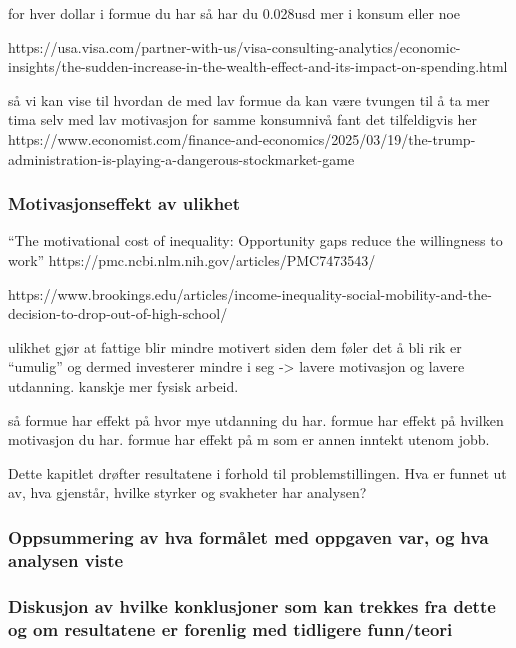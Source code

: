 \documentclass[
  12pt,
  a4paper,
  DIV=11,
  numbers=noendperiod]{scrartcl}
\begin{document}
for hver dollar i formue du har så har du 0.028usd mer i konsum eller
noe

https://usa.visa.com/partner-with-us/visa-consulting-analytics/economic-insights/the-sudden-increase-in-the-wealth-effect-and-its-impact-on-spending.html

så vi kan vise til hvordan de med lav formue da kan være tvungen til å
ta mer tima selv med lav motivasjon for samme konsumnivå fant det
tilfeldigvis her
https://www.economist.com/finance-and-economics/2025/03/19/the-trump-administration-is-playing-a-dangerous-stockmarket-game

\subsubsection{Motivasjonseffekt av
ulikhet}\label{motivasjonseffekt-av-ulikhet}

``The motivational cost of inequality: Opportunity gaps reduce the
willingness to work'' https://pmc.ncbi.nlm.nih.gov/articles/PMC7473543/

https://www.brookings.edu/articles/income-inequality-social-mobility-and-the-decision-to-drop-out-of-high-school/

ulikhet gjør at fattige blir mindre motivert siden dem føler det å bli
rik er ``umulig'' og dermed investerer mindre i seg -\textgreater{}
lavere motivasjon og lavere utdanning. kanskje mer fysisk arbeid.

så formue har effekt på hvor mye utdanning du har. formue har effekt på
hvilken motivasjon du har. formue har effekt på m som er annen inntekt
utenom jobb.

Dette kapitlet drøfter resultatene i forhold til problemstillingen. Hva
er funnet ut av, hva gjenstår, hvilke styrker og svakheter har analysen?

\subsubsection{Oppsummering av hva formålet med oppgaven var, og hva
analysen
viste}\label{oppsummering-av-hva-formuxe5let-med-oppgaven-var-og-hva-analysen-viste}

\subsubsection{Diskusjon av hvilke konklusjoner som kan trekkes fra
dette og om resultatene er forenlig med tidligere
funn/teori}\label{diskusjon-av-hvilke-konklusjoner-som-kan-trekkes-fra-dette-og-om-resultatene-er-forenlig-med-tidligere-funnteori}
\end{document}

